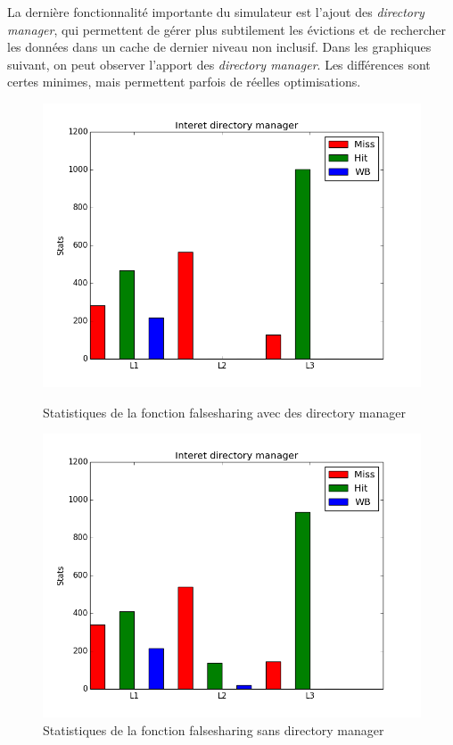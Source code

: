 La dernière fonctionnalité importante du simulateur est l'ajout des \emph{directory manager}, qui permettent de gérer plus subtilement les évictions et de rechercher les données dans un cache de dernier niveau non inclusif. Dans les graphiques suivant, on peut observer l'apport des \emph{directory manager}. Les différences sont certes minimes, mais permettent parfois de réelles optimisations. 

\begin{figure}[H]
   \begin{minipage}[l]{.46\textwidth}
     \includegraphics[scale=0.35]{images/stats_falsesharing_directory.png}
     \caption{\label{img:inclusifs} Statistiques de la fonction falsesharing avec des directory manager}
   \end{minipage} \hfill
   \begin{minipage}[r]{.46\textwidth}
     \includegraphics[scale=0.35]{images/stats_falsesharing_no_directory.png}
     \caption{\label{img:inclusifs} Statistiques de la fonction falsesharing sans directory manager}
   \end{minipage}
\end{figure}

